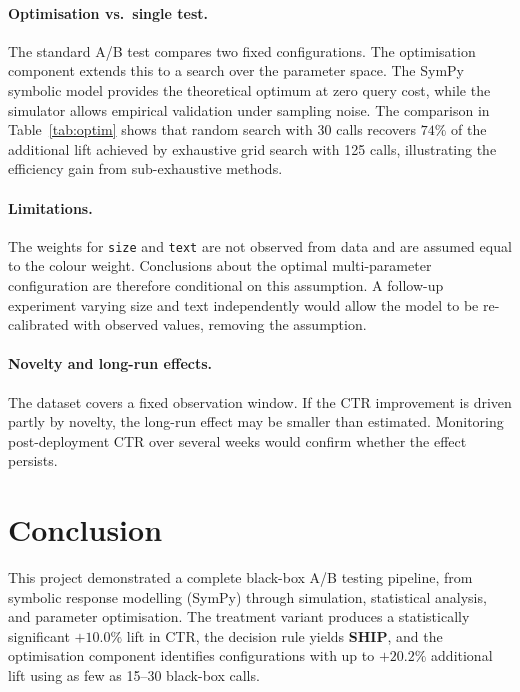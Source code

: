 \documentclass[a4paper,12pt]{extarticle}
\numberwithin{equation}{section}
\begin{document}
\paragraph{Optimisation vs.\ single test.} The standard A/B
test compares two fixed configurations. The optimisation
component extends this to a search over the parameter space.
The SymPy symbolic model provides the theoretical optimum
at zero query cost, while the simulator allows empirical
validation under sampling noise. The comparison in
Table~\ref{tab:optim} shows that random search with 30 calls
recovers $74\%$ of the additional lift achieved by exhaustive
grid search with 125 calls, illustrating the efficiency gain
from sub-exhaustive methods.

\paragraph{Limitations.} The weights for \texttt{size} and
\texttt{text} are not observed from data and are assumed equal
to the colour weight. Conclusions about the optimal
multi-parameter configuration are therefore conditional on
this assumption. A follow-up experiment varying size and text
independently would allow the model to be re-calibrated with
observed values, removing the assumption.

\paragraph{Novelty and long-run effects.} The dataset covers a
fixed observation window. If the CTR improvement is driven
partly by novelty, the long-run effect may be smaller than
estimated. Monitoring post-deployment CTR over several weeks
would confirm whether the effect persists.

\clearpage

\section*{Conclusion}

This project demonstrated a complete black-box A/B testing
pipeline, from symbolic response modelling (SymPy) through
simulation, statistical analysis, and parameter optimisation.
The treatment variant produces a statistically significant
$+10.0\%$ lift in CTR, the decision rule yields \textbf{SHIP},
and the optimisation component identifies configurations with
up to $+20.2\%$ additional lift using as few as 15--30
black-box calls.

\clearpage

\printbibliography
\end{document}
